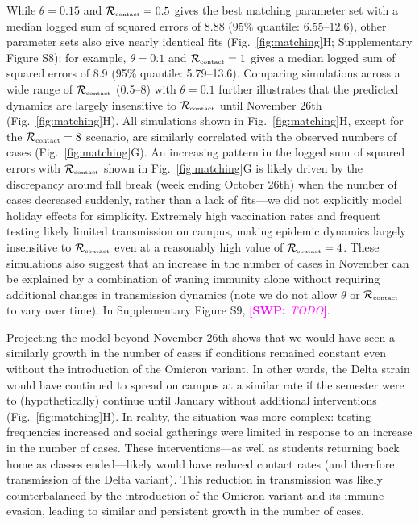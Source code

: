 \documentclass[12pt]{article}
\newcommand{\fref}[1]{Fig.~\ref{fig:#1}}
\newcommand{\Rx}[1]{\ensuremath{{\mathcal R}_{#1}}}
\newcommand{\Rc}{\Rx{\textrm{\tiny{contact}}}}
\newcommand{\comment}[3]{\textcolor{#1}{\textbf{[#2: }\textsl{#3}\textbf{]}}}
\newcommand{\swp}[1]{\comment{magenta}{SWP}{#1}}
\begin{document}
While $\theta = 0.15$ and $\Rc = 0.5$ gives the best matching parameter set with a median logged sum of squared errors of 8.88 (95\% quantile: 6.55--12.6), other parameter sets also give nearly identical fits (\fref{matching}H; Supplementary Figure S8):
for example, $\theta = 0.1$ and $\Rc = 1$ gives a median logged sum of squared errors of 8.9 (95\% quantile: 5.79--13.6).
Comparing simulations across a wide range of $\Rc$ (0.5--8) with $\theta = 0.1$ further illustrates that the predicted dynamics are largely insensitive to $\Rc$ until November 26th (\fref{matching}H).
All simulations shown in \fref{matching}H, except for the $\Rc=8$ scenario, are similarly correlated with the observed numbers of cases (\fref{matching}G). 
An increasing pattern in the logged sum of squared errors with $\Rc$ shown in \fref{matching}G is likely driven by the discrepancy around fall break (week ending October 26th) when the number of cases decreased suddenly, rather than a lack of fits---we did not explicitly model holiday effects for simplicity.
Extremely high vaccination rates and frequent testing likely limited transmission on campus, making epidemic dynamics largely insensitive to $\Rc$ even at a reasonably high value of $\Rc = 4$.
These simulations also suggest that an increase in the number of cases in November can be explained by a combination of waning immunity alone without requiring additional changes in transmission dynamics (note we do not allow $\theta$ or $\Rc$ to vary over time).
In Supplementary Figure S9, \swp{TODO}.

Projecting the model beyond November 26th shows that we would have seen a similarly growth in the number of cases if conditions remained constant even without the introduction of the Omicron variant.
In other words, the Delta strain would have continued to spread on campus at a similar rate if the semester were to (hypothetically) continue until January without additional interventions (\fref{matching}H).
In reality, the situation was more complex: testing frequencies increased and social gatherings were limited in response to an increase in the number of cases.
These interventions---as well as students returning back home as classes ended---likely would have reduced contact rates (and therefore transmission of the Delta variant).
This reduction in transmission was likely counterbalanced by the introduction of the Omicron variant and its immune evasion, leading to similar and persistent growth in the number of cases.
\end{document}
